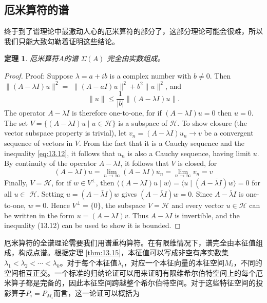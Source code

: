 \documentclass[hyperref,UTF8]{ctexbook}
\newtheorem{theorem}{定理}[chapter]
\begin{document}
\subsection{厄米算符的谱}
终于到了谱理论中最激动人心的厄米算符的部分了，这部分理论可能会很难，所以我们只能大致勾勒着证明这些结论。
\begin{theorem}
    厄米算符\( A \)的谱 \(\Sigma(A)\) 完全由实数组成。
\end{theorem}
\begin{proof}
Proof: Suppose \(\lambda=a+i b\) is a complex number with \(b \neq 0\). Then \(\|(A-\lambda I) u\|^{2}=\) \(\|(A-a I) u\|^{2}+b^{2}\|u\|^{2}\), and
\begin{equation}\label{eq:13.12}
    \|u\| \leq \frac{1}{|b|}\|(A-\lambda I) u\| .
\end{equation}
The operator \(A-\lambda I\) is therefore one-to-one, for if \((A-\lambda I) u=0\) then \(u=0\).
The set \(V=\{(A-\lambda I) u \mid u \in \mathcal{H}\}\) is a subspace of \(\mathcal{H}\). To show closure (the vector subspace property is trivial), let \(v_{n}=(A-\lambda I) u_{n} \rightarrow v\) be a convergent sequence of vectors in \(V\). From the fact that it is a Cauchy sequence and the inequality \ref{eq:13.12}, it follows that \(u_{n}\) is also a Cauchy sequence, having limit \(u\). By continuity of the operator \(A-\lambda I\), it follows that \(V\) is closed, for
\[
(A-\lambda I) u=\lim _{n \rightarrow \infty}(A-\lambda I) u_{n}=\lim _{n \rightarrow \infty} v_{n}=v
\]
Finally, \(V=\mathcal{H}\), for if \(w \in V^{\perp}\), then \(\langle(A-\lambda I) u \mid w\rangle=\langle u \mid(A-\bar{\lambda} I) w\rangle=0\) for all \(u \in\) \(\mathcal{H}\). Setting \(u=(A-\bar{\lambda} I) w\) gives \((A-\bar{\lambda} I) w=0\). Since \(A-\bar{\lambda} I\) is one-to-one, \(w=0\). Hence \(V^{\perp}=\{0\}\), the subspace \(V=\mathcal{H}\) and every vector \(u \in \mathcal{H}\) can be written in the form \(u=(A-\lambda I) v\). Thus \(A-\lambda I\) is invertible, and the inequality (13.12) can be used to show it is bounded.
\end{proof}
厄米算符的全谱理论需要我们用谱重构算符。在有限维情况下，谱完全由本征值组成，构成点谱。根据定理 \ref{thm:13.15}，本征值可以写成非空有序实数集 \(\lambda_{1}<\lambda_{2}<\cdots<\lambda_{k}\)。对于每个本征值\(\lambda_{i}\)，对应一个本征向量的本征空间\(M_{i}\)，不同的空间相互正交。一个标准的归纳论证可以用来证明有限维希尔伯特空间上的每个厄米算子都是完备的，因此本征空间跨越整个希尔伯特空间。对于这些特征空间的投影算子\(P_{i}=P_{M_{i}}\)而言，这一论证可以概括为
\end{document}
